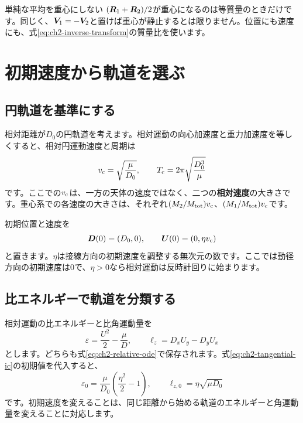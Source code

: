 \begin{failbox}{単純な平均を重心にしない}
$(\boldsymbol R_1+\boldsymbol R_2)/2$が重心になるのは等質量のときだけです。同じく、$\boldsymbol V_1=-\boldsymbol V_2$と置けば重心が静止するとは限りません。位置にも速度にも、式\eqref{eq:ch2-inverse-transform}の質量比を使います。
\end{failbox}

\section{初期速度から軌道を選ぶ}
\label{sec:ch2-orbit-types}
\subsection{円軌道を基準にする}
相対距離が$D_0$の円軌道を考えます。相対運動の向心加速度と重力加速度を等しくすると、相対円運動速度と周期は
\begin{equation}
v_{\rm c}=\sqrt{\frac{\mu}{D_0}},\qquad
T_{\rm c}=2\pi\sqrt{\frac{D_0^3}{\mu}}
\label{eq:ch2-circle}
\end{equation}
です。ここでの$v_{\rm c}$は、一方の天体の速度ではなく、二つの\textbf{相対速度}の大きさです。重心系での各速度の大きさは、それぞれ$(M_2/M_{\rm tot})v_{\rm c}$、$(M_1/M_{\rm tot})v_{\rm c}$です。

初期位置と速度を
\begin{equation}
\boldsymbol D(0)=(D_0,0),\qquad \boldsymbol U(0)=(0,\eta v_{\rm c})
\label{eq:ch2-tangential-ic}
\end{equation}
と置きます。$\eta$は接線方向の初期速度を調整する無次元の数です。ここでは動径方向の初期速度は0で、$\eta>0$なら相対運動は反時計回りに始まります。

\subsection{比エネルギーで軌道を分類する}
相対運動の比エネルギーと比角運動量を
\begin{equation}
\varepsilon=\frac{U^2}{2}-\frac{\mu}{D},\qquad
\ell_z=D_xU_y-D_yU_x
\label{eq:ch2-specific-integrals}
\end{equation}
とします。どちらも式\eqref{eq:ch2-relative-ode}で保存されます。式\eqref{eq:ch2-tangential-ic}の初期値を代入すると、
\begin{equation}
\varepsilon_0=\frac{\mu}{D_0}\left(\frac{\eta^2}{2}-1\right),\qquad
\ell_{z,0}=\eta\sqrt{\mu D_0}
\label{eq:ch2-initial-integrals}
\end{equation}
です。初期速度を変えることは、同じ距離から始める軌道のエネルギーと角運動量を変えることに対応します。

